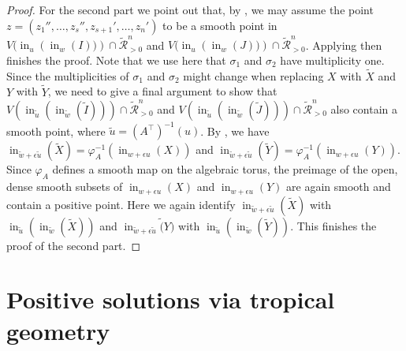 \documentclass{article}
\theoremstyle{definition}
\DeclareMathOperator{\initial}{in}
\begin{document}
\begin{proof}
    For the second part we point out that, by
    , we may assume the point $z = (z_1'', \dots, z_s'', z_{s+1}', \dots, z_n')$ to be a smooth point in $V(\initial_{{u}} \left( \initial_{ w}( I )) \right) \cap \widetilde{\mathcal{R}}^n_{>0}$ and $V(\initial_{{u}} \left( \initial_{ w}( J ))\right) \cap \widetilde{\mathcal{R}}^n_{>0}$.
    Applying  then finishes the proof. 
    Note that we use here that $\sigma_1$ and $\sigma_2$ have multiplicity one. Since the multiplicities of $\sigma_1$ and $\sigma_2$ might change when replacing $X$ with $\widetilde{X}$ and $Y$ with $\widetilde{Y}$, we need to give a final argument to show that $V(\initial_{\widetilde{u}}( \initial_{\widetilde{w}}( \widetilde{I} ) ) ) \cap \widetilde{\mathcal{R}}^n_{>0}$ and $V(\initial_{\widetilde{u}} ( \initial_{ \widetilde{w}}( \widetilde{J} ))) \cap \widetilde{\mathcal{R}}^n_{>0}$ also contain a smooth point, where $\widetilde{u} = (A^\top)^{-1}(u)$.
    By , we have $\initial_{\widetilde w+ \epsilon\widetilde{u}} (\widetilde{X}) = \varphi_A^{-1}(\initial_{w+\epsilon u} (X))$ and $\initial_{\widetilde w+\epsilon\widetilde{ u}} (\widetilde{Y}) = \varphi_A^{-1}(\initial_{w+\epsilon u} (Y))$. Since $\varphi_A$ defines a smooth map on the algebraic torus, the preimage of the open, dense smooth subsets of $\initial_{w+\epsilon u} (X)$ and $\initial_{w+\epsilon u} (Y)$ are again smooth and contain a positive point. Here we again identify $\initial_{\widetilde w+\epsilon \widetilde u} (\widetilde X)$ with $\initial_{\widetilde u} ( \initial_{\widetilde w} (\widetilde X) )$ and $\initial_{\widetilde w+\epsilon \widetilde u} \widetilde (Y)$ with $\initial_{\widetilde u} (\initial_{\widetilde w} (\widetilde Y))$. This finishes the proof of the second part.
\end{proof}


\section{Positive solutions via tropical geometry}
\label{Sec:PosSolsTrop}
\end{document}
